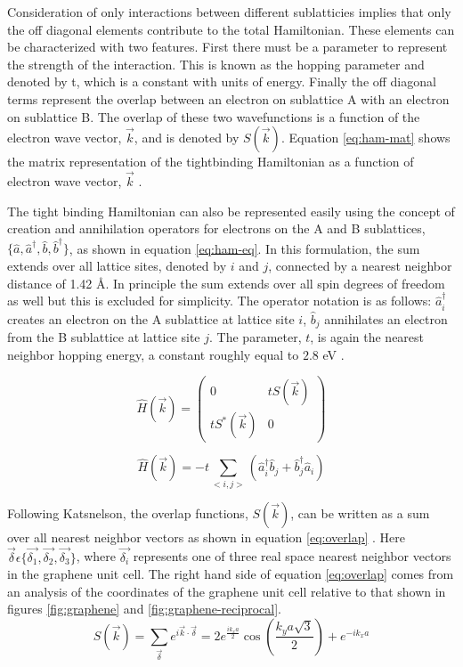 	Consideration of only interactions between different sublatticies implies that only the off diagonal elements contribute to the total Hamiltonian. These elements can be characterized with two features. First there must be a parameter to represent the strength of the interaction. This is known as the hopping parameter and denoted by t, which is a constant with units of energy. Finally the off diagonal terms represent the overlap between an electron on sublattice A with an electron on sublattice B. The overlap of these two wavefunctions is a function of the electron wave vector, $\vec{k}$, and is denoted by $S(\vec{k})$. Equation \ref{eq:ham-mat} shows the matrix representation of the tightbinding Hamiltonian as a function of electron wave vector, $\vec{k}$ \cite{katsnelson}.

	The tight binding Hamiltonian can also be represented easily using the concept of creation and annihilation operators for electrons on the A and B sublattices, $\{\hat{a}, \hat{a}^{\dagger}, \hat{b}, \hat{b}^{\dagger} \}$, as shown in equation \ref{eq:ham-eq}. In this formulation, the sum extends over all lattice sites, denoted by $i$ and $j$, connected by a nearest neighbor distance of 1.42 {\AA}. In principle the sum extends over all spin degrees of freedom as well but this is excluded for simplicity. The operator notation is as follows: $\hat{a}_{i}^{\dagger}$ creates an electron on the A sublattice at lattice site $i$, $\hat{b}_{j}$ annihilates an electron from the B sublattice at lattice site $j$. The parameter, $t$, is again the nearest neighbor hopping energy, a constant roughly equal to $2.8$ eV \cite{geim-elec}.

\begin{equation}
\label{eq:ham-mat}
\hat{H}(\vec{k}) = \begin{pmatrix}
0& tS(\vec{k})\\
tS^*(\vec{k})& 0
\end{pmatrix}
\end{equation}


\begin{equation}
\label{eq:ham-eq}
\hat{H}(\vec{k}) = -t \sum_{<i,j>}( \hat{a}_{i}^{\dagger} \hat{b}_{j} + \hat{b}_{j}^{\dagger} \hat{a}_{i} )
\end{equation}


Following Katsnelson, the overlap functions, $S(\vec{k})$, can be written as a sum over all nearest neighbor vectors as shown in equation \ref{eq:overlap} \cite{katsnelson}. Here $\vec{\delta} \epsilon \{ \vec{\delta_1}, \vec{\delta_2}, \vec{\delta_3} \}$, where $\vec{\delta_i}$ represents one of three real space nearest neighbor vectors in the graphene unit cell. The right hand side of equation \ref{eq:overlap} comes from an analysis of the coordinates of the graphene unit cell relative to that shown in figures \ref{fig:graphene} and \ref{fig:graphene-reciprocal}.
 \begin{equation}
 \label{eq:overlap}
 S(\vec{k}) = \sum_{\vec{\delta}} e^{i \vec{k} \cdot \vec{\delta} } = 2 e^{\frac{i k_x a}{2}} \cos{( \frac{k_y a \sqrt{3}}{2})} + e^{- i k_x a}
 \end{equation}

